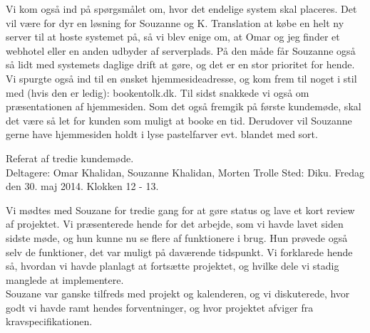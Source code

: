 \documentclass[12pt]{article}   %
\begin{document}
Vi kom også ind på spørgsmålet om, hvor det endelige system skal placeres. Det vil være for dyr en løsning for Souzanne og K. Translation at købe en helt ny server til at hoste systemet på, så vi blev enige om, at Omar og jeg finder et webhotel eller en anden udbyder af serverplads. På den måde får Souzanne også så lidt med systemets daglige drift at gøre, og det er en stor prioritet for hende. Vi spurgte også ind til en ønsket hjemmesideadresse, og kom frem til noget i stil med (hvis den er ledig): bookentolk.dk.  
Til sidst snakkede vi også om præsentationen af hjemmesiden. Som det også fremgik på første kundemøde, skal det være så let for kunden som muligt at booke en tid. Derudover vil Souzanne gerne have hjemmesiden holdt i lyse pastelfarver evt. blandet med sort.

\newpage

Referat af tredie kundemøde.\\

Deltagere: Omar Khalidan, Souzanne Khalidan, Morten Trolle
Sted: Diku. Fredag den 30. maj 2014. Klokken 12 - 13.

Vi mødtes med Souzane for tredie gang for at gøre status og lave et kort review af projektet. Vi præsenterede hende for det arbejde, som vi havde lavet siden sidste møde, og hun kunne nu se flere af funktionere i brug. Hun prøvede også selv de funktioner, det var muligt på daværende tidspunkt. Vi forklarede hende så, hvordan vi havde planlagt at fortsætte projektet, og hvilke dele vi stadig manglede at implementere. \\
Souzane var ganske tilfreds med projekt og kalenderen, og vi diskuterede, hvor godt vi havde ramt hendes forventninger, og hvor projektet afviger fra kravspecifikationen. 
\end{document}
